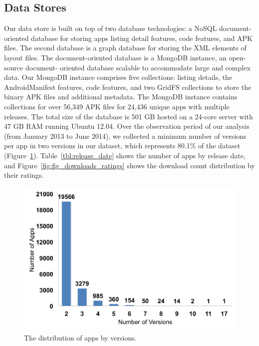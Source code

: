 \subsection{Data Stores}
Our data store is built on top of two database technologies: a NoSQL document-oriented database for storing apps listing detail features, code features, and APK files.
The second database is a graph database for storing the XML elements of layout files. The document-oriented database is a MongoDB instance, an open-source document- oriented database scalable to accommodate large and complex data. Our MongoDB instance comprises five collections: listing details, the AndroidManifest features, code features, and two GridFS collections to store the binary APK files and additional metadata. The MongoDB instance contains collections for over 56,349 APK files for 24,436 unique apps with multiple releases. The total size of the database is 501 GB hosted on a 24-core server with 47 GB RAM running Ubuntu 12.04. Over the observation period of our analysis (from January 2013 to June 2014), we collected a minimum number of versions per app in two versions in our dataset, which represents 80.1\% of the dataset (Figure~\ref{fig:fig_dataset}). Table~\ref{tbl:release_date} shows the number of apps by release date, and Figure~\ref{fig:fig_downloads_ratings} shows the download count distribution by their ratings.
\begin{figure}
	\includegraphics[width=6in, height=3in]{figures/design-pattern-changes/dataset}
	\caption{The distribution of apps by versions.}
	\label{fig:fig_dataset}
\end{figure}


